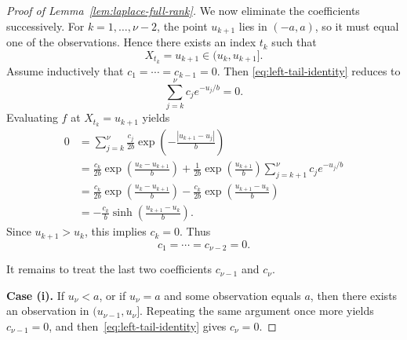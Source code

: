 \documentclass[english, 11pt]{article}
\theoremstyle{plain}
\theoremstyle{definition}
\theoremstyle{remark}
\begin{document}
\begin{appendix}
\begin{proof}[Proof of Lemma~\ref{lem:laplace-full-rank}]
We now eliminate the coefficients successively. For $k=1,\dots,\nu-2$, the point $u_{k+1}$ lies in $(-a,a)$, so it must equal one of the observations. Hence there exists an index $t_k$ such that
\begin{equation*}
X_{t_k}=u_{k+1}\in (u_k,u_{k+1}].
\end{equation*}
Assume inductively that $c_1=\cdots=c_{k-1}=0$. Then \eqref{eq:left-tail-identity} reduces to
\begin{equation*}
\sum_{j=k}^\nu c_j e^{-u_j/b}=0.
\end{equation*}
Evaluating $f$ at $X_{t_k}=u_{k+1}$ yields
\begin{align*}
0&=\sum_{j=k}^\nu \frac{c_j}{2b}\exp\left(-\frac{|u_{k+1}-u_j|}{b}\right) \\
&=\frac{c_k}{2b}\exp\left(\frac{u_k-u_{k+1}}{b}\right)+\frac{1}{2b}\exp\left(\frac{u_{k+1}}{b}\right)\sum_{j=k+1}^\nu c_j e^{-u_j/b} \\
&=\frac{c_k}{2b}\exp\left(\frac{u_k-u_{k+1}}{b}\right)-\frac{c_k}{2b}\exp\left(\frac{u_{k+1}-u_k}{b}\right) \\
&=-\frac{c_k}{b}\sinh\left(\frac{u_{k+1}-u_k}{b}\right).
\end{align*}
Since $u_{k+1}>u_k$, this implies $c_k=0$. Thus
\begin{equation*}
c_1=\cdots=c_{\nu-2}=0.
\end{equation*}

It remains to treat the last two coefficients $c_{\nu-1}$ and $c_\nu$.

\textbf{Case (i).} If $u_\nu<a$, or if $u_\nu=a$ and some observation equals $a$, then there exists an observation in $(u_{\nu-1},u_\nu]$. Repeating the same argument once more yields $c_{\nu-1}=0$, and then~\eqref{eq:left-tail-identity} gives $c_\nu=0$.


\end{proof}
\end{appendix}
\end{document}
